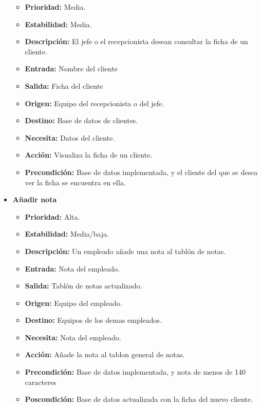 \documentclass[spanish,a4paper,12pt]{report}	%
\begin{document}
\begin{itemize}
		\begin{itemize}
			\item \textbf{Prioridad: }Media.
			\item \textbf{Estabilidad: }Media.
			\item \textbf{Descripción: }El jefe o el recepcionista desean consultar la ficha de un cliente.
			\item \textbf{Entrada: } Nombre del cliente
			\item \textbf{Salida: }Ficha del cliente
			\item \textbf{Origen: }Equipo del recepcionista o del jefe.
			\item \textbf{Destino: }Base de datos de clientes. 
			\item \textbf{Necesita: }Datos del cliente. 
			\item \textbf{Acción: }Visualiza la ficha de un cliente.
			\item \textbf{Precondición: }Base de datos implementada, y el cliente del que se desea ver la ficha se encuentra en ella.
		\end{itemize}%

		\item \textbf{Añadir nota}  %

		\begin{itemize}
			\item \textbf{Prioridad: }Alta.
			\item \textbf{Estabilidad: }Media/baja.
			\item \textbf{Descripción: }Un empleado añade una nota al tablón de notas.
			\item \textbf{Entrada: } Nota del empleado.
			\item \textbf{Salida: }Tablón de notas actualizado.
			\item \textbf{Origen: }Equipo del empleado.
			\item \textbf{Destino: }Equipos de los demas empleados. 
			\item \textbf{Necesita: }Nota del empleado. 
			\item \textbf{Acción: }Añade la nota al tablon general de notas.
			\item \textbf{Precondición: }Base de datos implementada, y nota de menos de 140 caracteres
			\item \textbf{Poscondición: }Base de datos actualizada con la ficha del nuevo cliente. 



\end{itemize}
\end{itemize}
\end{document}
